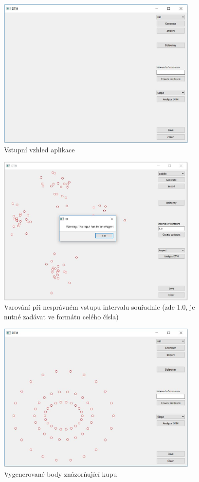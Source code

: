 \documentclass[a4paper, 12pt]{article}
\begin{document}
\begin{figure}[h!]
\centering
\includegraphics[width=10cm]{pictures/vstup.jpg}
\caption{Vstupní vzhled aplikace}
\end{figure}

\begin{figure}[h!]
\centering
\includegraphics[width=10cm]{pictures/warning.jpg}
\caption{Varování při nesprávném vstupu intervalu souřadnic (zde 1.0, je nutné zadávat ve formátu celého čísla)}
\end{figure}

\begin{figure}[h!]
\centering
\includegraphics[width=10cm]{pictures/hill.jpg}
\caption{Vygenerované body znázorňující kupu}
\end{figure}
\end{document}
